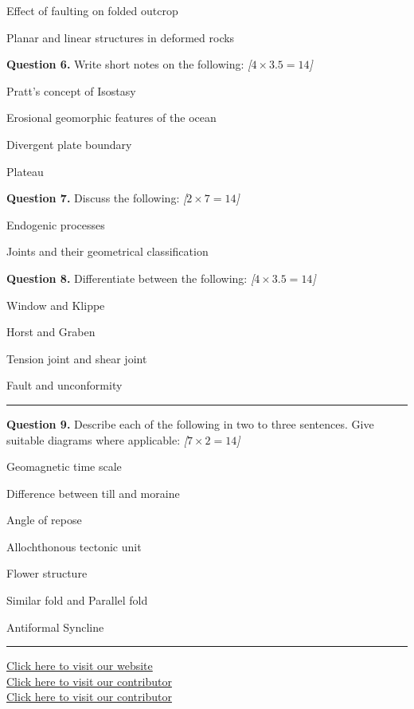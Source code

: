 \documentclass[11pt,a4paper]{article}
\newcommand{\pts}[1]{\hfill   \textit{[#1]}}
\begin{document}
\begin{parts}
  \item Effect of faulting on folded outcrop
  \item Planar and linear structures in deformed rocks
\end{parts}

\medskip


\noindent   \textbf{Question 6.} Write short notes on the following: \pts{$4  \times 3.5 = 14$}

\begin{parts}
  \item Pratt's concept of Isostasy
  \item Erosional geomorphic features of the ocean
  \item Divergent plate boundary
  \item Plateau
\end{parts}

\medskip


\noindent   \textbf{Question 7.} Discuss the following: \pts{$2  \times 7 = 14$}

\begin{parts}
  \item Endogenic processes
  \item Joints and their geometrical classification
\end{parts}

\medskip


\noindent   \textbf{Question 8.} Differentiate between the following: \pts{$4  \times 3.5 = 14$}

\begin{parts}
  \item Window and Klippe
  \item Horst and Graben
  \item Tension joint and shear joint
  \item Fault and unconformity
\end{parts}

\bigskip


\rule{\linewidth}{0.4pt}\smallskip




\noindent   \textbf{Question 9.} Describe each of the following in two to three sentences. Give suitable diagrams where applicable: \pts{$7  \times 2 = 14$}

\begin{romanparts}
  \item Geomagnetic time scale
  \item Difference between till and moraine
  \item Angle of repose
  \item Allochthonous tectonic unit
  \item Flower structure
  \item Similar fold and Parallel fold
  \item Antiformal Syncline
\end{romanparts}

\vfill\rule{\linewidth}{0.4pt}

\begin{center}\small
\href{https://bhu-exam.vercel.app/}{Click here to visit our website}\\[4pt]
\href{https://me-aryan.vercel.app/}{Click here to visit our contributor}\\[4pt]
\href{https://quashan-me.vercel.app/}{Click here to visit our contributor}
\end{center}
\end{document}
